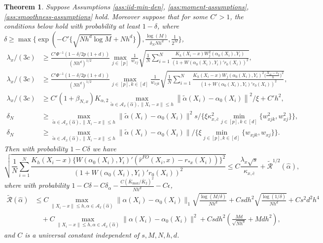 \documentclass[11pt]{article}
\newtheorem{theorem}{Theorem}
\newcommand{\norm}[1]{\left\lVert #1 \right\rVert}
\begin{document}
\begin{theorem}\label{thm:main:covariate}
Suppose Assumptions \ref{ass:iid-min-den}, \ref{ass:moment-assumptions}, \ref{ass:smoothness-assumptions} hold. Moreover suppose that for some $C'>1$, the conditions below hold with probability at least $1-\delta$, where $\delta\geq\max\{\exp(-C'\{\sqrt{Nh^d\log M}+Nh^d\}),\frac{\log(M)}{\delta_NNh^d},\frac{1}{2^M}\}$,
$$\begin{array}{rl}
\lambda_x/(3c) &\displaystyle \geq \frac{C'\Phi^{-1}(1-\delta/2p(1+d))}{(Nh^d)^{1/2}}{\displaystyle \max_{j\in [p]}} \frac{1}{w_{xj}} \sqrt{\frac{1}{N}\sum_{i=1}^N\frac{K_h(X_i-x)W_j^2(\alpha_0(X_i),Y_i)}{(1+W(\alpha_0(X_i),Y_i)'r_0(X_i))^2}},\\
\lambda_x/(3c) &\displaystyle \geq \frac{C'\Phi^{-1}(1-\delta/2p(1+d))}{(Nh^d)^{1/2} }{\displaystyle \max_{j\in [p], k\in[d]}} \frac{1}{w_{xjk}} \sqrt{\frac{1}{N}\sum_{i=1}^N\frac{K_h(X_i-x)W_j(\alpha_0(X_i),Y_i)^2\big(\frac{X_{ik}-x_k}{h}\big)^2}{(1+W(\alpha_0(X_i),Y_i)'r_0(X_i))^2}},\\
\lambda_x/(3c) &\displaystyle \geq C'(1+\beta_{N,x})K_{\alpha,2}\max_{\tilde \alpha\in\mathcal{A}_x(\hat\alpha), \|X_i-x\|\leq h}\norm{\tilde{\alpha}(X_i)-\alpha_0(X_i)}^2/\xi+C'h^2,\\
\delta_N &\displaystyle \geq \max_{\tilde \alpha\in\mathcal{A}_x(\hat\alpha), \|X_i-x\|\leq h}\|\tilde\alpha(X_i)-\alpha_0(X_i)\|^2s/ \{\xi\kappa_{x,\bar c}^2 \min_{j\in[p], k\in[d]} \{w_{xjk}^2,w_{xj}^2\}\},\\
\delta_N&\displaystyle \geq \max_{\tilde \alpha\in\mathcal{A}_x(\hat\alpha), \|X_i-x\|\leq h}\|\tilde\alpha(X_i)-\alpha_0(X_i)\|/ \{\xi\min_{j\in[p], k\in[d]}\{w_{xjk},w_{xj}\}\}.
\end{array}$$ 
Then with probability $1-C\delta$ we have
{$$ \sqrt{\frac{1}{N}\sum_{i=1}^N \frac{K_h(X_i-x)\{W(\alpha_0(X_i),Y_i)'(\hat r^{FO}(X_i,x) - r_{*x}(X_i) )\}^2}{(1+W(\alpha_0(X_i),Y_i)'r_0(X_i))^2}} \leq C\frac{\lambda_x\sqrt{s}}{\kappa_{x,\bar{c}}} +  \widetilde{\mathcal{R}}^{1/2}(\hat\alpha),$$}
where with probability $1-C\delta-C\delta_\alpha-\frac{C(\bar{K}_{\max}/\bar{K}_2)^2}{Nh^d}-C\epsilon$,
$$\begin{array}{rl}
\widetilde{\mathcal{R}}(\hat\alpha) &\displaystyle\leq C\max_{\|X_i-x\|\leq h,\alpha \in \mathcal{A}_x(\hat\alpha)}\|\alpha(X_i)-\alpha_0(X_i)\|_1 \sqrt{\frac{\log(M/\delta)}{Nh^d}}+ Csdh^2\sqrt{\frac{\log(1/\delta)}{Nh^d}}+Cs^2d^2h^4\\
&\displaystyle\quad + C\max_{\|X_i-x\|\leq h,\alpha \in \mathcal{A}_x(\hat\alpha)} \|\alpha(X_i)-\alpha_0(X_i)\|^2+Csdh^2\left(\frac{Md}{\sqrt{Nh^{d}}}+Mdh^2\right),
\end{array}$$
and $C$ is a universal constant independent of $s,M,N,h,d$. 
\end{theorem}
\end{document}
